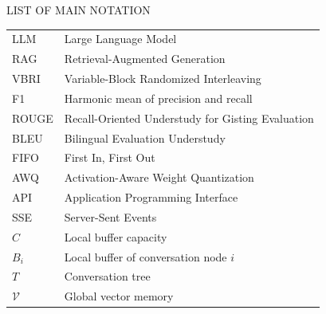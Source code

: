 \clearpage
\begin{center}
{\Large LIST OF MAIN NOTATION}\\[60pt]
\end{center}
\noindent
\begin{longtable}[l]{p{90pt}p{290pt}}
LLM & Large Language Model \\
RAG & Retrieval-Augmented Generation \\
VBRI & Variable-Block Randomized Interleaving \\
F1 & Harmonic mean of precision and recall \\
ROUGE & Recall-Oriented Understudy for Gisting Evaluation \\
BLEU & Bilingual Evaluation Understudy \\
FIFO & First In, First Out \\
AWQ & Activation-Aware Weight Quantization \\
API & Application Programming Interface \\
SSE & Server-Sent Events \\
$C$ & Local buffer capacity \\
$B_i$ & Local buffer of conversation node $i$ \\
$T$ & Conversation tree \\
$\mathcal{V}$ & Global vector memory \\
\end{longtable}
